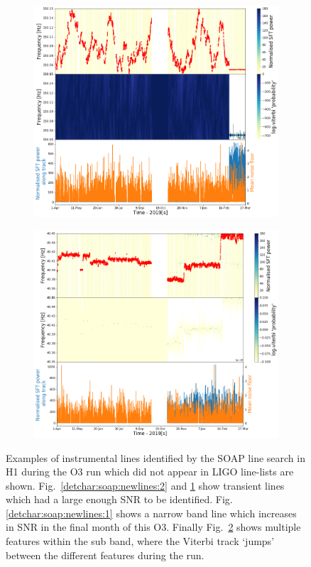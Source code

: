 \begin{figure}[ht]
	\begin{subfigure}[h]{0.49\textwidth}
		\includegraphics[width=\textwidth]{C6_detchar/track_F150_05_150_15.png}
		\caption{\label{detchar:soap:newlines:3}}
	\end{subfigure}
	\begin{subfigure}[h]{0.49\textwidth}
		\includegraphics[width=\textwidth]{C6_detchar/track_F40_35_40_45.png}
		\caption{\label{detchar:soap:newlines:4}}
	\end{subfigure}
	\caption[New lines identified by SOAP.]{ Examples of instrumental lines identified by the SOAP line search in H1 during the O3 run which did not appear in \gls{LIGO} line-lists are shown. Fig.~\ref{detchar:soap:newlines:2} and \ref{detchar:soap:newlines:3} show transient lines which had a large enough \gls{SNR} to be identified. Fig.\ref{detchar:soap:newlines:1} shows a narrow band line which increases in \gls{SNR} in the final month of this O3. Finally Fig.~\ref{detchar:soap:newlines:4} shows multiple features within the sub band, where the Viterbi track `jumps' between the different features during the run.}
	\label{detchar:soap:newlines}
\end{figure}
%
\clearpage 

